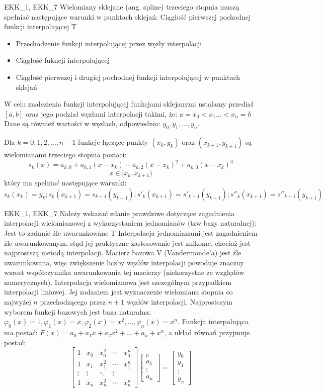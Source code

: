 \answer
{EKK\_1, EKK\_7 Wielomiany sklejane (ang. spline) trzeciego stopnia muszą spełniać następujące warunki w punktach sklejań:}
{Ciągłość pierwszej pochodnej funkcji interpolującej}
{T}
{\begin{itemize}
\item Przechodzenie funkcji interpolującej przez węzły interpolacji
\item Ciągłość fukncji interpolującej
\item Ciągłość pierwszej i drugiej pochodnej funkcji interpolującej w punktach sklejań
\end{itemize}}
{W celu znalezienia funkcji interpolującej funkcjami sklejanymi ustalamy przediał $[a,b]$ oraz jego podział węzłami interpolacji takimi, że: $a=x_0<x_1\ldots<x_n=b$ Dane są równieź wartości w węzłach, odpowiednio: $y_0, y_1,\ldots,y_n$. 

Dla $k=0,1,2,\ldots,n-1$ funkcje łączące punkty $(x_{k},y_{k})$ oraz $(x_{k+1},y_{k+1})$ są wielomianami trzeciego stopnia postaci: 
$$s_{k}(x)=a_{k,0}+a_{k,1}(x-x_{k})+a_{k,2}(x-x_{k})^{2}+a_{k,3}(x-x_{k})^{3}$$
$$x\in[x_{k},x_{k+1})$$
który ma spełniać następujące warunki:
$$s_{k}(x_{k})=y_{k}; s_{k}(x_{k+1})=s_{k+1}(y_{k+1}); s'_{k}(x_{k+1})=s'_{k+1}(y_{k+1}); s''_{k}(x_{k+1})=s''_{k+1}(y_{k+1})$$
}
\answer
{EKK\_1, EKK\_7 Należy wskazać zdanie prawdziwe dotyczące zagadnienia interpolacji wielomianowej z wykorzystaniem jednomianów (tzw bazy naturalnej):}
{Jest to zadanie źle uwarunkowane}
{T}
{Interpolacja jednomianami jest zagadnieniem źle uwarunkowanym, stąd jej praktyczne zastosowanie jest znikome, chociaż jest najprostszą metodą interpolacji. Macierz bazowa V (Vandermonde'a) jest źle uwarunkowana, więc zwiększenie liczby węzłów interpolacji powoduje znaczny wzrost współczynnika uwarunkowania tej macierzy (niekorzystne ze względów numerycznych).}
{Interpolacja wielomianowa jest szczególnym przypadkiem interpolacji liniowej. Jej zadaniem jest wyznaczenie wielomianu stopnia co najwyżej $n$ przechodzącego przez $n+1$ węzłów interpolacji. Najprostszym wyborem funkcji bazowych jest baza naturalna: $\varphi_0(x)=1, \varphi_1(x)=x, \varphi_2(x)=x^2, \ldots, \varphi_n(x)=x^n$. Funkcja interpolująca ma postać: $F(x)=a_0+a_1x+a_2x^2+\ldots+a_n+x^n$, a układ równań przyjmuje postać:
$$\left[ \begin{array}{ccccc}
1 & x_0 & x_0^2 & \cdots & x_0^n \\
1 & x_1 & x_1^2 & \cdots & x_1^n \\
\vdots & \vdots & \ddots & \vdots \\
1 & x_n & x_n^2 & \cdots & x_n^n
\end{array} \right] \left[ \begin{array}{c}
_0\\
a_1\\
\vdots\\
a_n
\end{array} \right] = \left[ \begin{array}{c}
y_0\\
y_1\\
\vdots\\
y_n
\end{array} \right]$$ }

